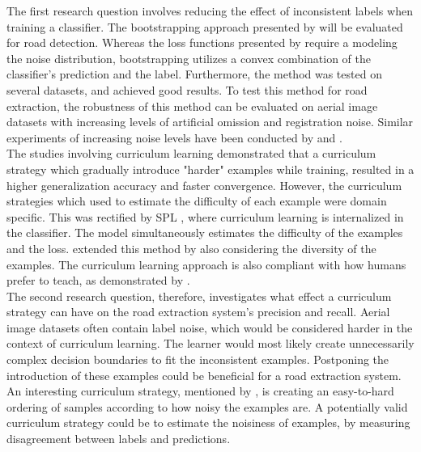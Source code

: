 The first research question involves reducing the effect of inconsistent labels when training a classifier. The bootstrapping approach presented by \cite{Reed_noisy_labels_bootstrapping} will be evaluated for road detection. Whereas the loss functions presented by \cite{Mnih_aerial_images_noisy} require a modeling the noise distribution,  bootstrapping utilizes a convex combination of the classifier's prediction and the label. Furthermore, the method was tested on several datasets, and achieved good results. To test this method for road extraction, the robustness of this method can be evaluated on aerial image datasets with increasing levels of artificial omission and registration noise. Similar experiments of increasing noise levels have been conducted by \citep{Sukhbaatar_noisy_network_learning} and \citep{Reed_noisy_labels_bootstrapping}.\\

The studies involving curriculum learning demonstrated that a curriculum strategy which gradually introduce "harder" examples while training, resulted in a higher generalization accuracy and faster convergence. However, the curriculum strategies which \cite{Bengio_curriculumlearning} used to estimate the difficulty of each example were domain specific. This was rectified by \ac{SPL} \citep{Kumar_self_paced_learning}, where curriculum learning is internalized in the classifier. The model simultaneously estimates the difficulty of the examples and the loss. \cite{Lu_self-paced_learning_diversity} extended this method by also considering the diversity of the examples. The curriculum learning approach is also compliant with how humans prefer to teach, as demonstrated by \cite{Khan_human_teach}.\\

The second research question, therefore, investigates what effect a curriculum strategy can have on the road extraction system's precision and recall. Aerial image datasets often contain label noise, which would be considered harder in the context of curriculum learning. The learner would most likely create unnecessarily complex decision boundaries to fit the inconsistent examples. Postponing the introduction of these examples could be beneficial for a road extraction system. An interesting curriculum strategy, mentioned by \cite{Bengio_curriculumlearning}, is creating an easy-to-hard ordering of samples according to how noisy the examples are. A potentially valid curriculum strategy could be to estimate the noisiness of examples, by measuring disagreement between labels and predictions.\\